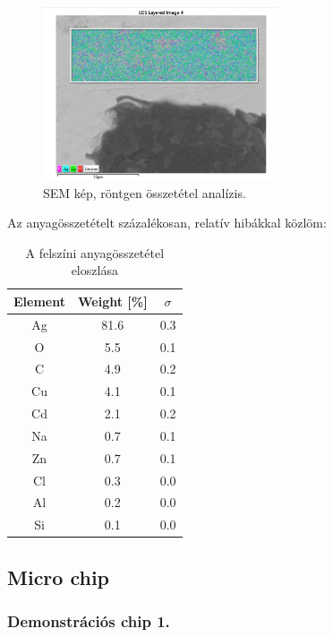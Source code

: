 \documentclass[a4paper,12pt]{article}
\begin{document}
\begin{figure}[H]
	\centering
	\includegraphics[width=0.62\textwidth]{./Jcsop/lancrtg.png}
	\caption{SEM kép, röntgen összetétel analízis.}
\end{figure}

\par Az anyagösszetételt százalékosan, relatív hibákkal közlöm:

\begin{table}[H]
	\centering
	\begin{tabular}{|c|c|c|}  \hline
		Element & Weight [\%] & $\sigma$ \\ \hline
		Ag      & 81.6        & 0.3      \\ \hline
		O       & 5.5         & 0.1      \\ \hline
		C       & 4.9         & 0.2      \\ \hline
		Cu      & 4.1         & 0.1      \\ \hline
		Cd      & 2.1         & 0.2      \\ \hline
		Na      & 0.7         & 0.1      \\ \hline
		Zn      & 0.7         & 0.1      \\ \hline
		Cl      & 0.3         & 0.0      \\ \hline
		Al      & 0.2         & 0.0      \\ \hline
		Si      & 0.1         & 0.0      \\ \hline
	\end{tabular}
	\caption{A felszíni anyagösszetétel eloszlása}
	\label{my-label}
\end{table}

\subsection{Micro chip}

\subsubsection{Demonstrációs chip 1.}
\end{document}
